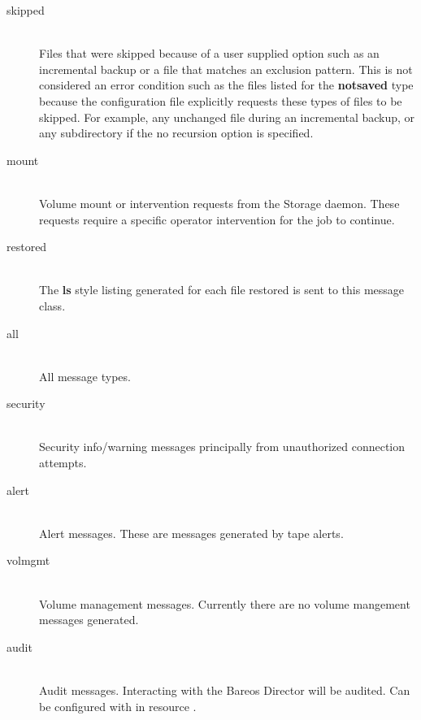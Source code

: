 \begin{description}
\begin{description}
\item [skipped] \hfill \\
Files that were skipped because of a user supplied option such as an
incremental backup or a file that matches an exclusion pattern.  This is
not considered an error condition such as the files listed for the {\bf
notsaved} type because the configuration file explicitly requests these
types of files to be skipped.  For example, any unchanged file during an
incremental backup, or any subdirectory if the no recursion option is
specified.

\item [mount] \hfill \\
Volume mount or intervention requests from the Storage daemon.  These
requests require a specific operator intervention for the job to
continue.

\item [restored] \hfill \\
The {\bf ls} style listing generated for each file restored is sent to
this message class.

\item [all] \hfill \\
All message types.

\item [security] \hfill \\
Security info/warning messages principally from unauthorized
connection attempts.

\item [alert] \hfill \\
Alert messages. These are messages generated by tape alerts.

\item [volmgmt] \hfill \\
Volume management messages. Currently there are no volume mangement
messages generated.

\item [audit] \hfill \\
Audit messages. Interacting with the Bareos Director will be audited.
Can be configured with in resource .

\end{description}

\end{description}

